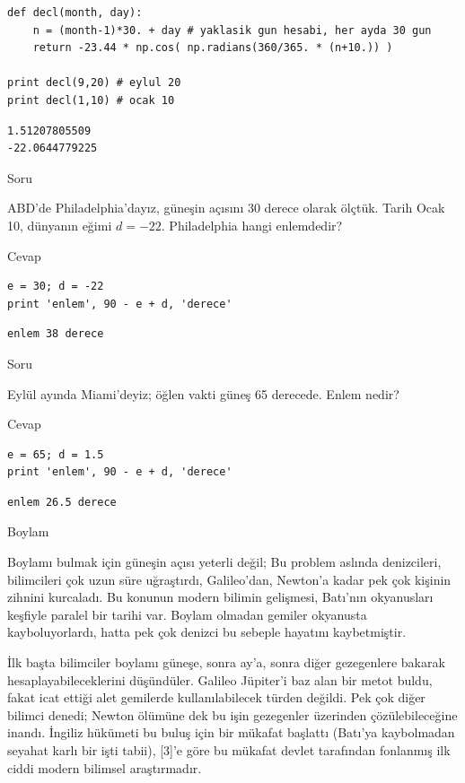 \documentclass[12pt,fleqn]{article}\usepackage{../../common}
\begin{document}
\begin{verbatim}
def decl(month, day):
    n = (month-1)*30. + day # yaklasik gun hesabi, her ayda 30 gun
    return -23.44 * np.cos( np.radians(360/365. * (n+10.)) )

print decl(9,20) # eylul 20
print decl(1,10) # ocak 10
\end{verbatim}

\begin{verbatim}
1.51207805509
-22.0644779225
\end{verbatim}

Soru

ABD'de Philadelphia'dayız, güneşin açısını 30 derece olarak ölçtük. Tarih Ocak
10, dünyanın eğimi $d=-22$. Philadelphia hangi enlemdedir?

Cevap

\begin{verbatim}
e = 30; d = -22
print 'enlem', 90 - e + d, 'derece'
\end{verbatim}

\begin{verbatim}
enlem 38 derece
\end{verbatim}

Soru

Eylül ayında Miami'deyiz; öğlen vakti güneş 65 derecede. Enlem nedir?

Cevap

\begin{verbatim}
e = 65; d = 1.5
print 'enlem', 90 - e + d, 'derece'
\end{verbatim}

\begin{verbatim}
enlem 26.5 derece
\end{verbatim}

Boylam

Boylamı bulmak için güneşin açısı yeterli değil; Bu problem aslında denizcileri,
bilimcileri çok uzun süre uğraştırdı, Galileo'dan, Newton'a kadar pek çok
kişinin zihnini kurcaladı. Bu konunun modern bilimin gelişmesi, Batı'nın
okyanusları keşfiyle paralel bir tarihi var. Boylam olmadan gemiler okyanusta
kayboluyorlardı, hatta pek çok denizci bu sebeple hayatını kaybetmiştir.

İlk başta bilimciler boylamı güneşe, sonra ay'a, sonra diğer gezegenlere bakarak
hesaplayabileceklerini düşündüler. Galileo Jüpiter'i baz alan bir metot buldu,
fakat icat ettiği alet gemilerde kullanılabilecek türden değildi. Pek çok diğer
bilimci denedi; Newton ölümüne dek bu işin gezegenler üzerinden çözülebileceğine
inandı. İngiliz hükümeti bu buluş için bir mükafat başlattı (Batı'ya kaybolmadan
seyahat karlı bir işti tabii), [3]'e göre bu mükafat devlet tarafından fonlanmış
ilk ciddi modern bilimsel araştırmadır.
\end{document}
